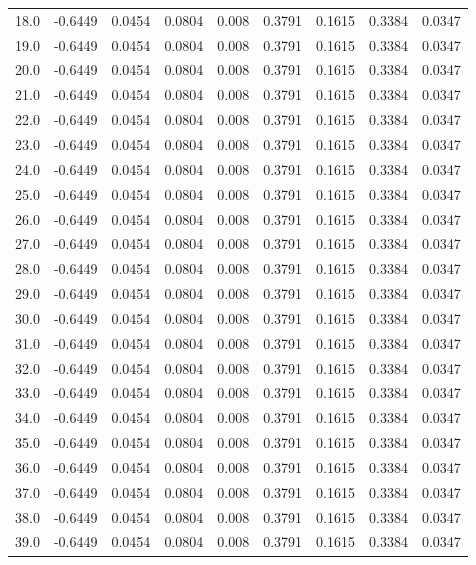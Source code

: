 \begin{longtable}{lrrrrrrrr}
18.0 & -0.6449 & 0.0454 & 0.0804 & 0.008 & 0.3791 & 0.1615 & 0.3384 & 0.0347 \\
19.0 & -0.6449 & 0.0454 & 0.0804 & 0.008 & 0.3791 & 0.1615 & 0.3384 & 0.0347 \\
20.0 & -0.6449 & 0.0454 & 0.0804 & 0.008 & 0.3791 & 0.1615 & 0.3384 & 0.0347 \\
21.0 & -0.6449 & 0.0454 & 0.0804 & 0.008 & 0.3791 & 0.1615 & 0.3384 & 0.0347 \\
22.0 & -0.6449 & 0.0454 & 0.0804 & 0.008 & 0.3791 & 0.1615 & 0.3384 & 0.0347 \\
23.0 & -0.6449 & 0.0454 & 0.0804 & 0.008 & 0.3791 & 0.1615 & 0.3384 & 0.0347 \\
24.0 & -0.6449 & 0.0454 & 0.0804 & 0.008 & 0.3791 & 0.1615 & 0.3384 & 0.0347 \\
25.0 & -0.6449 & 0.0454 & 0.0804 & 0.008 & 0.3791 & 0.1615 & 0.3384 & 0.0347 \\
26.0 & -0.6449 & 0.0454 & 0.0804 & 0.008 & 0.3791 & 0.1615 & 0.3384 & 0.0347 \\
27.0 & -0.6449 & 0.0454 & 0.0804 & 0.008 & 0.3791 & 0.1615 & 0.3384 & 0.0347 \\
28.0 & -0.6449 & 0.0454 & 0.0804 & 0.008 & 0.3791 & 0.1615 & 0.3384 & 0.0347 \\
29.0 & -0.6449 & 0.0454 & 0.0804 & 0.008 & 0.3791 & 0.1615 & 0.3384 & 0.0347 \\
30.0 & -0.6449 & 0.0454 & 0.0804 & 0.008 & 0.3791 & 0.1615 & 0.3384 & 0.0347 \\
31.0 & -0.6449 & 0.0454 & 0.0804 & 0.008 & 0.3791 & 0.1615 & 0.3384 & 0.0347 \\
32.0 & -0.6449 & 0.0454 & 0.0804 & 0.008 & 0.3791 & 0.1615 & 0.3384 & 0.0347 \\
33.0 & -0.6449 & 0.0454 & 0.0804 & 0.008 & 0.3791 & 0.1615 & 0.3384 & 0.0347 \\
34.0 & -0.6449 & 0.0454 & 0.0804 & 0.008 & 0.3791 & 0.1615 & 0.3384 & 0.0347 \\
35.0 & -0.6449 & 0.0454 & 0.0804 & 0.008 & 0.3791 & 0.1615 & 0.3384 & 0.0347 \\
36.0 & -0.6449 & 0.0454 & 0.0804 & 0.008 & 0.3791 & 0.1615 & 0.3384 & 0.0347 \\
37.0 & -0.6449 & 0.0454 & 0.0804 & 0.008 & 0.3791 & 0.1615 & 0.3384 & 0.0347 \\
38.0 & -0.6449 & 0.0454 & 0.0804 & 0.008 & 0.3791 & 0.1615 & 0.3384 & 0.0347 \\
39.0 & -0.6449 & 0.0454 & 0.0804 & 0.008 & 0.3791 & 0.1615 & 0.3384 & 0.0347 \\

\end{longtable}
